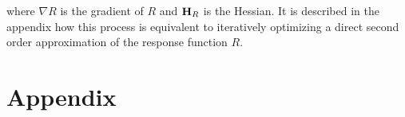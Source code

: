 \documentclass{article}
\newcommand{\vect}[1]{\textbf{\textrm{#1}}}
\begin{document}
where $\nabla R$ is the gradient of $R$ and $\vect{H}_R$ is the Hessian.
It is described in the appendix how this process is equivalent to iteratively optimizing a direct second order approximation of the response function $R$.

\begin{comment}
\section{A note on implementation}
Rather than being incorporated into mathematical formalism, the constraint on stimulus amplitude can also be implemented by re-normalizing the stimulus after every iteration of the optimizer. Geometrically, this has the effect of moving the new point $\vect{x}_{n+1}$ onto the sphere $\sum_n{x_n^2} = 1$ without changing the direction of the vector. \par
\hfill \newline
Additional, more general, constraints on the Newton optimization method regard properties of the Hessian matrix.
From \eqref{updateruledog} it can be seen that the response function Hessian must be invertible, that is

\begin{equation}
	\text{det}(\vect{H}_R) \neq 0
\end{equation}

In the case of \eqref{objmat}, it can be seen from \eqref{objhessian} that $\text{det}(\vect{H}_R) = 0$ if any term in the impulse-response kernel matrix $\hat{\vect{G}}$ is $0$. Thus invertibility can be guaranteed by adding a small number to all elements of the diagonal.

Further, if a maximum is required, the Hessian must be negative definite (all eigenvalues are $< 0$).
The first condition implies that the algorithm will fail if $\vect{x}$ falls on an inflection point, and the second condition is necessary for the search direction to point towards a maximum. 
Both of these conditions can be dealt with by re-intializing the optimization from a new starting point when one of the conditions is violated.
This method should be implemented even when the algorithm successfully terminates, as the search method does not guarantee that a global maximum will be found. 
\end{comment}

\section{Appendix} \label{appendix}
\end{document}
